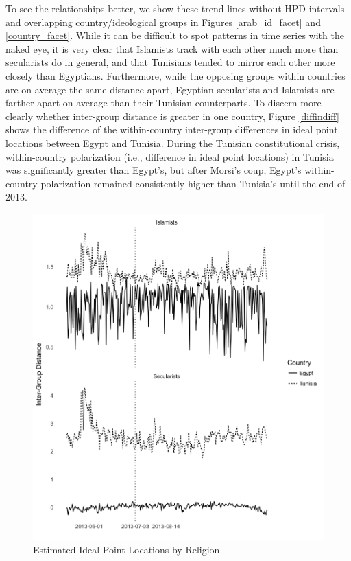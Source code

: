 \documentclass[12pt]{article}
\begin{document}
 To see the relationships better, we show these trend lines without HPD intervals and overlapping country/ideological groups in Figures \ref{arab_id_facet} and \ref{country_facet}. While it can be difficult to spot patterns in time series with the naked eye, it is very clear that Islamists track with each other much more than secularists do in general, and that Tunisians tended to mirror each other more closely than Egyptians. Furthermore, while the opposing groups within countries are on average the same distance apart, Egyptian secularists and Islamists are farther apart on average than their Tunisian counterparts. To discern more clearly whether inter-group distance is greater in one country, Figure \ref{diffindiff} shows the difference of the within-country inter-group differences in ideal point locations between Egypt and Tunisia. During the Tunisian constitutional crisis, within-country polarization (i.e., difference in ideal point locations) in Tunisia was significantly greater than Egypt's, but after Morsi's coup, Egypt's within-country polarization remained consistently higher than Tunisia's until the end of 2013.
 \begin{figure}[!h]
 	\centering
	\caption{Estimated Ideal Point Locations by Religion}\label{religion_facet}
	\centering
	\includegraphics[width=.9\linewidth]{religion_coint}
\end{figure}
\end{document}
